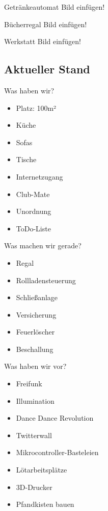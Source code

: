 \documentclass[hyperref={pdfpagelabels=false}]{beamer}
\begin{document}
\begin{frame}{Getränkeautomat}
    Bild einfügen!
\end{frame}

\begin{frame}{Bücherregal}
    Bild einfügen!
\end{frame}

\begin{frame}{Werkstatt}
    Bild einfügen!
\end{frame}

\subsection{Aktueller Stand}

\begin{frame}{Was haben wir?}
    \begin{itemize}
        \item Platz: 100m²
        \pause
        \item Küche
        \item Sofas
        \item Tische
        \pause
        \item Internetzugang
        \item Club-Mate
        \pause
        \item Unordnung
        \item ToDo-Liste
    \end{itemize}
\end{frame}

\begin{frame}{Was machen wir gerade?}
    \begin{itemize}
        \item Regal
        \pause
        \item Rollladensteuerung
        \pause
        \item Schließanlage
        \pause
        \item Versicherung
        \item Feuerlöscher
        \item Beschallung
    \end{itemize}
\end{frame}

\begin{frame}{Was haben wir vor?}
    \begin{itemize}
        \item Freifunk
        \item Illumination
        \item Dance Dance Revolution
        \item Twitterwall
        \item Mikrocontroller-Basteleien
        \item Lötarbeitsplätze
        \item 3D-Drucker
        \item Pfandkisten bauen
    \end{itemize}
\end{frame}
\end{document}
